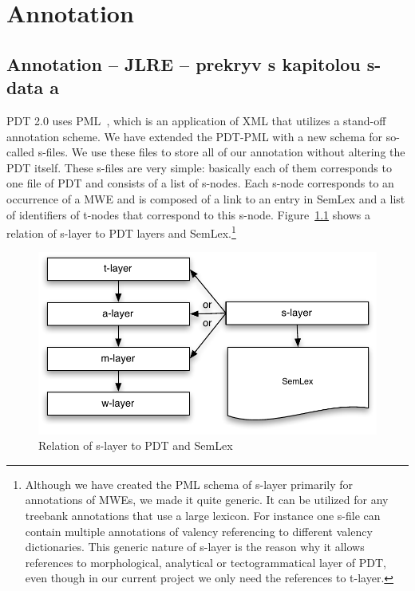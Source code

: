 
\chapter{Annotation}
\label{sec:annot}

\section{Annotation – JLRE -- prekryv s kapitolou s-data a \seman}
\label{sec:annot:jlre}

PDT 2.0 uses PML~\citep{pajas:2005}, which is an application of XML that utilizes a stand-off annotation scheme. We have extended the PDT-PML with a new schema for so-called s-files. We use these files to store all of our annotation without altering the PDT itself.
These s-files are very simple: basically each of them corresponds to one file of PDT and consists of a list of s-nodes. Each s-node corresponds to an occurrence of a MWE and is composed of a link to an entry in SemLex and a list of identifiers of t-nodes that correspond to this \mbox{s-node}. Figure~\ref{fig:s-layer} shows a relation of s-layer to PDT layers and SemLex.\footnote{Although we have created the PML schema of s-layer primarily for annotations of MWEs, we made it quite generic. It can be utilized for any treebank annotations that use a large lexicon. For instance one s-file can contain multiple annotations of valency referencing to different valency dictionaries. This generic nature of s-layer is the reason why it allows references to morphological, analytical or tectogrammatical layer of PDT, even though in our current project we only need the references to t-layer.}
\begin{figure}[htbp]
   \centering
   \includegraphics[scale=.5]{images/layers-with-s-layer.pdf} %
   \caption{Relation of s-layer to PDT and SemLex}
    \label{fig:s-layer}
\end{figure}


